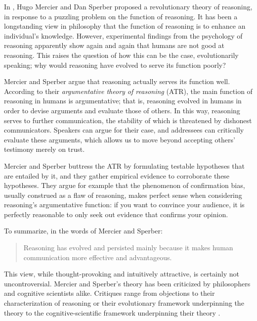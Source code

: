 
In \citeyear{MS11}, Hugo Mercier and Dan Sperber proposed a revolutionary
theory of reasoning, in response to a puzzling problem on the function of reasoning.
It has been a longstanding view in philosophy that the function of reasoning is to enhance an individual's knowledge. However, experimental findings from the psychology of reasoning apparently show again and again that humans are not good at reasoning. This raises the question of how this can be the case, evolutionarily speaking; why would reasoning have evolved to serve its function poorly?

Mercier and Sperber argue that reasoning actually serves its function well.
According to their \emph{argumentative theory of reasoning} (ATR), the main function of reasoning in humans is argumentative; that is, reasoning evolved in humans in order to devise arguments and evaluate those of others. In this way, reasoning serves to further communication, the stability of which is threatened by dishonest communicators. Speakers can argue for their case, and addressees can critically evaluate these arguments, which allows us to move beyond accepting others' testimony merely on trust.

Mercier and Sperber buttress the ATR by formulating testable hypotheses that are entailed by it, and they gather empirical evidence to corroborate these hypotheses. They argue for example that the phenomenon of confirmation bias, usually construed as a flaw of reasoning, makes perfect sense when considering reasoning's argumentative function: if you want to convince your audience, it is perfectly reasonable to only seek out evidence that confirms your opinion.

To summarize, in the words of Mercier and Sperber:
\begin{quote}
    Reasoning has evolved and persisted mainly because it makes human communication more effective and advantageous.
    \citep[p.~60]{MS11}
\end{quote}

This view, while thought-provoking and intuitively attractive, is certainly not uncontroversial. Mercier and Sperber's theory has been criticized by philosophers and cognitive scientists alike. Critiques range from objections to their characterization of reasoning \citep{Koren23} or their evolutionary framework underpinning the theory \citep{Novaes18} to the cognitive-scientific framework underpinning their theory \citep{Sterelny18, Chater18}.

